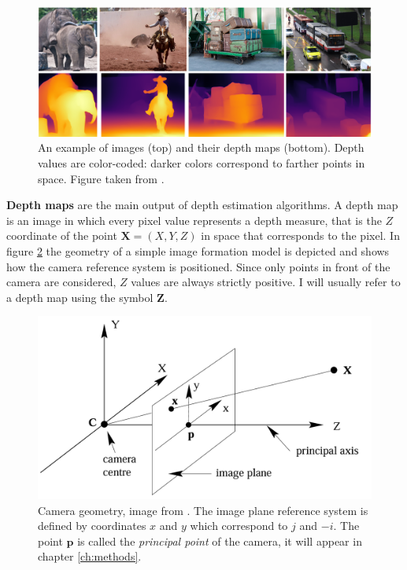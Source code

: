 \begin{figure}
    \centering
    \includegraphics[scale=0.3]{figs/depth_maps_example}
    \caption{
        An example of images (top) and their depth maps (bottom).
        Depth values are color-coded: darker colors correspond to farther points in space.
        Figure taken from \cite{MiDas}.
        \label{fig:depth_maps_example}
    }
\end{figure}

\textbf{Depth maps} are the main output of depth estimation algorithms.
A depth map is an image in which every pixel value represents a depth measure, that is the $Z$ coordinate of the point $\mathbf{X} = (X, Y, Z)$ in space that corresponds to the pixel.
In figure \ref{fig:coordinates} the geometry of a simple image formation model is depicted and shows how the camera reference system is positioned.
Since only points in front of the camera are considered, $Z$ values are always strictly positive.
I will usually refer to a depth map using the symbol $\mathbf{Z}$.
\begin{figure}
    \centering
    \includegraphics[scale=0.3]{figs/coordinates}
    \caption{
        Camera geometry, image from \cite{multiview}.
        The image plane reference system is defined by coordinates $x$ and $y$ which correspond to $j$ and $-i$.
        The point $\mathbf{p}$ is called the \textit{principal point} of the camera, it will appear in chapter \ref{ch:methods}.
        \label{fig:coordinates}
    }
\end{figure}

